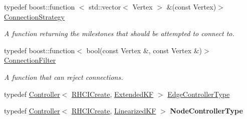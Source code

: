 \begin{DoxyCompactItemize}
\item 
typedef boost\-::function\*
$<$ std\-::vector$<$ \-Vertex $>$\*
 \&(const \-Vertex)$>$ \hyperlink{class_f_i_r_m_a15cfbcaf52c0bdd5e6c1a969bbf7ea1e}{\-Connection\-Strategy}
\begin{DoxyCompactList}\small\item\em \-A function returning the milestones that should be attempted to connect to. \end{DoxyCompactList}\item 
typedef boost\-::function$<$ bool(const \*
\-Vertex \&, const \-Vertex \&)$>$ \hyperlink{class_f_i_r_m_a2482eee2e5248d5bff3b3b56e5a593b3}{\-Connection\-Filter}
\begin{DoxyCompactList}\small\item\em \-A function that can reject connections. \end{DoxyCompactList}\item 
typedef \hyperlink{class_controller}{\-Controller}$<$ \hyperlink{class_r_h_c_i_create}{\-R\-H\-C\-I\-Create}, \*
\hyperlink{class_extended_k_f}{\-Extended\-K\-F} $>$ \hyperlink{class_f_i_r_m_a70abcb24fbc9f836b94119f65c8f8a37}{\-Edge\-Controller\-Type}
\item 
\hypertarget{class_f_i_r_m_adf37596ffd4dbf633d7cd0f27347d15c}{typedef \hyperlink{class_controller}{\-Controller}$<$ \hyperlink{class_r_h_c_i_create}{\-R\-H\-C\-I\-Create}, \*
\hyperlink{class_linearized_k_f}{\-Linearized\-K\-F} $>$ {\bfseries \-Node\-Controller\-Type}}\label{class_f_i_r_m_adf37596ffd4dbf633d7cd0f27347d15c}

\end{DoxyCompactItemize}
